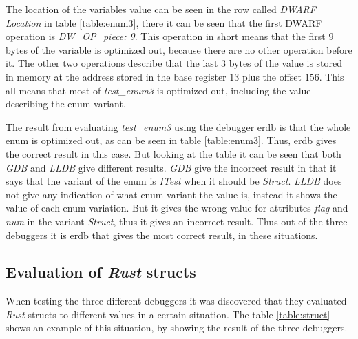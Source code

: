 The location of the variables value can be seen in the row called \emph{DWARF Location} in table \ref{table:enum3}, there it can be seen that the first \gls{DWARF} operation is \emph{DW\_OP\_piece: 9}.
This operation in short means that the first $9$ bytes of the variable is optimized out, because there are no other operation before it.
The other two operations describe that the last $3$ bytes of the value is stored in memory at the address stored in the base register $13$ plus the offset $156$.
This all means that most of \emph{test\_enum3} is optimized out, including the value describing the enum variant.


The result from evaluating \emph{test\_enum3} using the debugger \gls{erdb} is that the whole enum is optimized out, as can be seen in table \ref{table:enum3}.
Thus, \gls{erdb} gives the correct result in this case.
But looking at the table it can be seen that both \emph{GDB} and \emph{LLDB} give different results.
\emph{GDB} give the incorrect result in that it says that the variant of the enum is \emph{ITest} when it should be \emph{Struct}.
\emph{LLDB} does not give any indication of what enum variant the value is, instead it shows the value of each enum variation.
But it gives the wrong value for attributes \emph{flag} and \emph{num} in the variant \emph{Struct}, thus it gives an incorrect result.
Thus out of the three debuggers it is \gls{erdb} that gives the most correct result, in these situations.



\subsection{Evaluation of \emph{Rust} structs}
When testing the three different debuggers it was discovered that they evaluated \emph{Rust} structs to different values in a certain situation.
The table \ref{table:struct} shows an example of this situation, by showing the result of the three debuggers.


